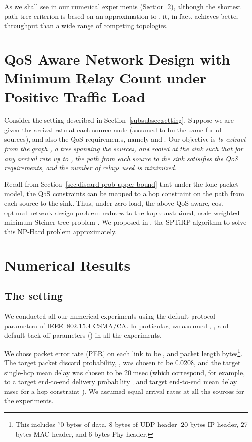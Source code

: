 \documentclass[12pt, draftclsnofoot, onecolumn]{IEEEtran}
\begin{document}
As we shall see in our numerical experiments (Section~\ref{sec:numerical-results}), although the shortest path tree criterion is based on an approximation to , it, in fact, achieves better throughput than a wide range of competing topologies.  

\section{QoS Aware Network Design with Minimum Relay Count under Positive Traffic Load}
Consider the setting described in Section~\ref{subsubsec:setting}. Suppose we are given the arrival rate  at each source node (assumed to be the same for all sources), and also the QoS requirements, namely  and . Our objective is \emph{to extract from the graph , a tree spanning the sources, and rooted at the sink such that for any arrival rate up to , the path from each source to the sink satisifies the QoS requirements, and the number of relays used is minimized.}

Recall from Section~\ref{sec:discard-prob-upper-bound} that under the lone packet model, the QoS constraints can be mapped to a hop constraint on the path from each source to the sink. Thus, under zero load, the above QoS aware, cost optimal network design problem reduces to the hop constrained, node weighted minimum Steiner tree problem \cite{fullpaper, klein}. We proposed in \cite{iwqos, fullpaper}, the SPTiRP algorithm to solve this NP-Hard problem approximately. 
\fi


\section{Numerical Results}
\label{sec:numerical-results}

\subsection{The setting}
\label{subsec:experiment-setting}
We conducted all our numerical experiments using the default protocol parameters of IEEE~802.15.4 CSMA/CA. In particular, we assumed , , and default back-off parameters (\cite{IEEE}) in all the experiments. 

We chose packet error rate (PER) on each link to be , and packet length  bytes\footnote{This includes 70 bytes of data, 8 bytes of UDP header, 20 bytes IP header, 27 bytes MAC header, and 6 bytes Phy header.}. The target packet discard probability, , was chosen to be 0.0208, and the target single-hop mean delay was chosen to be 20 msec (which correspond, for example, to a target end-to-end delivery probability , and target end-to-end mean delay  msec for a hop constraint ). We assumed equal arrival rates at all the sources for the experiments. 
\end{document}
